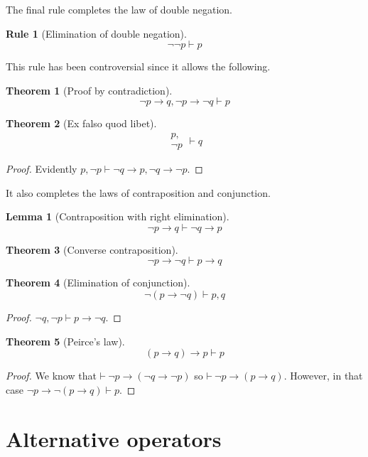 \documentclass{amsbook}
\newcommand{\infers}{\mathrel\vdash}
\newcommand{\theorem}{\mathord\vdash\medspace}
\newcommand{\then}{\mathrel\rightarrow}
\theoremstyle{definition}
\newtheorem{frule}{Rule}[section]
\newtheorem{thm}{Theorem}[section]
\newtheorem{lmm}{Lemma}[section]
\begin{document}
The final rule completes the law of double negation.

\begin{frule}[Elimination of double negation]
    $${\neg\neg p} \infers p$$
\end{frule}

This rule has been controversial since it allows the following.

\begin{thm}[Proof by contradiction]
    $$\neg p \then q, \neg p \then \neg q \infers p$$
\end{thm}

\begin{thm}[Ex falso quod libet]
    $$\begin{aligned}
            p, \\ \neg p
        \end{aligned}\infers q$$
    \begin{proof}
        Evidently $p, \neg p \infers \neg q \then p, \neg q \then \neg p$.
    \end{proof}
\end{thm}

It also completes the laws of contraposition and conjunction.

\begin{lmm}[Contraposition with right elimination]
    $$\neg p \then q \infers \neg q \then p$$
\end{lmm}

\begin{thm}[Converse contraposition]
    $$\neg p \then \neg q \infers p \then q$$
\end{thm}

\begin{thm}[Elimination of conjunction]
    $$\neg(p \then \neg q) \infers p, q$$
    \begin{proof}
        $\neg q, \neg p \infers p \then \neg q$.
    \end{proof}
\end{thm}


\begin{thm}[Peirce's law]
    $$(p \then q) \then p \infers p$$
    \begin{proof}
        We know that $\theorem \neg p \then (\neg q \then \neg p)$ so $\theorem \neg p \then (p \then q)$. However, in that case $\neg p \then \neg(p \then q) \infers p$.
    \end{proof}
\end{thm}

\section{Alternative operators}
\end{document}
